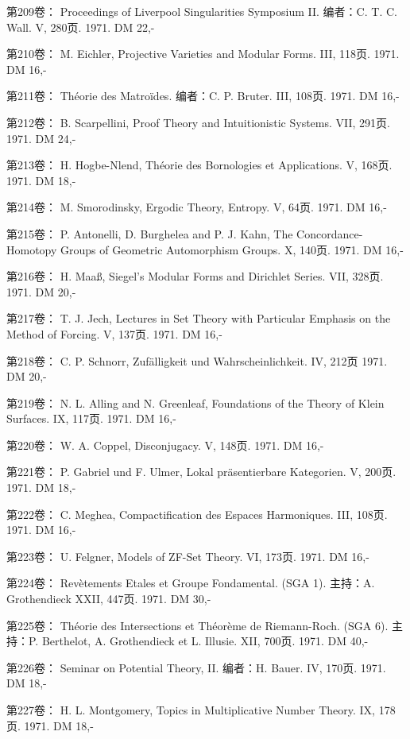 第209卷： Proceedings of Liverpool Singularities \quad Symposium II. 编者：C. T. C. Wall. V, 280页. 1971. DM 22,-

第210卷： M. Eichler, Projective Varieties and Modular Forms. III, 118页. 1971. DM 16,-

第211卷： Théorie des Matroïdes. 编者：C. P. Bruter. III, 108页. 1971. DM 16,-

第212卷： B. Scarpellini, Proof Theory and Intuitionistic Systems. VII, 291页. 1971. DM 24,-

第213卷： H. Hogbe-Nlend, Théorie des Bornologies et Applications. V, 168页. 1971. DM 18,-

第214卷： M. Smorodinsky, Ergodic Theory, Entropy. V, 64页. 1971. DM 16,-

第215卷： P. Antonelli, D. Burghelea and P. J. Kahn, The Concordance-Homotopy Groups of Geometric Automorphism Groups. X, 140页. 1971. DM 16,-

第216卷： H. Maaß, Siegel's Modular Forms and Dirichlet Series. VII, 328页. 1971. DM 20,-

第217卷： T. J. Jech, Lectures in Set Theory with Particular Emphasis on the Method of Forcing. V, 137页. 1971. DM 16,-

第218卷： C. P. Schnorr, Zufälligkeit und Wahrscheinlichkeit. IV, 212页 1971. DM 20,-

第219卷： N. L. Alling and N. Greenleaf, Foundations of the Theory of Klein Surfaces. IX, 117页. 1971. DM 16,-

第220卷： W. A. Coppel, Disconjugacy. V, 148页. 1971. DM 16,-

第221卷： P. Gabriel und F. Ulmer, Lokal präsentierbare Kategorien. V, 200页. 1971. DM 18,-

第222卷： C. Meghea, Compactification des Espaces Harmoniques. III, 108页. 1971. DM 16,-

第223卷： U. Felgner, Models of ZF-Set Theory. VI, 173页. 1971. DM 16,-

第224卷： Revètements Etales et Groupe Fondamental. (SGA 1). 主持：A. Grothendieck XXII, 447页. 1971. DM 30,-

第225卷： Théorie des Intersections et Théorème de Riemann-Roch. (SGA 6). 主持：P. Berthelot, A. Grothendieck et L. Illusie. XII, 700页. 1971. DM 40,-

第226卷： Seminar on Potential Theory, II. 编者：H. Bauer. IV, 170页. 1971. DM 18,-

第227卷： H. L. Montgomery, Topics in Multiplicative Number Theory. IX, 178页. 1971. DM 18,-

